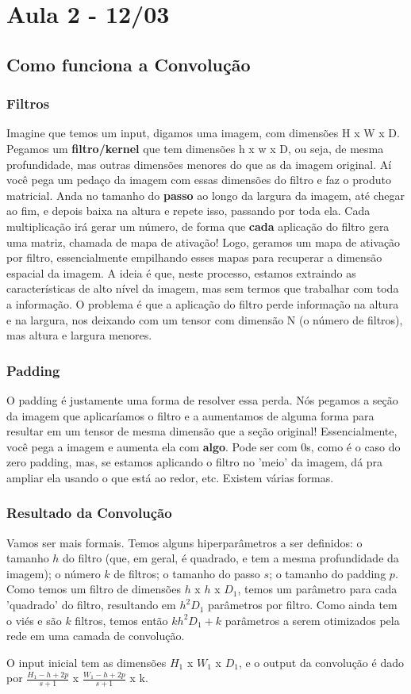 \documentclass{article}
\begin{document}
\section{Aula 2 - 12/03}
\subsection{Como funciona a Convolução}
\subsubsection{Filtros}
Imagine que temos um input, digamos uma imagem, com dimensões H x W x D. Pegamos um \textbf{filtro/kernel} que tem dimensões h x w x D, ou seja, de mesma profundidade, mas outras dimensões menores do que as da imagem original. Aí você pega um pedaço da imagem com essas dimensões do filtro e faz o produto matricial. Anda no tamanho do \textbf{passo} ao longo da largura da imagem, até chegar ao fim, e depois baixa na altura e repete isso, passando por toda ela. Cada multiplicação irá gerar um número, de forma que \textbf{cada} aplicação do filtro gera uma matriz, chamada de mapa de ativação! Logo, geramos um mapa de ativação por filtro, essencialmente empilhando esses mapas para recuperar a dimensão espacial da imagem. 
A ideia é que, neste processo, estamos extraindo as características de alto nível da imagem, mas sem termos que trabalhar com toda a informação. O problema é que a aplicação do filtro perde informação na altura e na largura, nos deixando com um tensor com dimensão N (o número de filtros), mas altura e largura menores. 
\subsubsection{Padding}
O padding é justamente uma forma de resolver essa perda. Nós pegamos a seção da imagem que aplicaríamos o filtro e a aumentamos de alguma forma para resultar em um tensor de mesma dimensão que a seção original! Essencialmente, você pega a imagem e aumenta ela com \textbf{algo}. Pode ser com 0s, como é o caso do zero padding, mas, se estamos aplicando o filtro no 'meio' da imagem, dá pra ampliar ela usando o que está ao redor, etc. Existem várias formas.
\subsubsection{Resultado da Convolução}
Vamos ser mais formais. Temos alguns hiperparâmetros a ser definidos:
o tamanho $h$ do filtro (que, em geral, é quadrado, e tem a mesma profundidade da imagem); o número $k$ de filtros; o tamanho do passo $s$; o tamanho do padding $p$. Como temos um filtro de dimensões $h$ x $h$ x $D_1$, temos um parâmetro para cada 'quadrado' do filtro, resultando em $h^2 D_1$ parâmetros por filtro. Como ainda tem o viés e são $k$ filtros, temos então $kh^2D_1 + k$ parâmetros a serem otimizados pela rede em uma camada de convolução. \par
O input inicial tem as dimensões $H_1$ x $W_1$ x $D_1$, e o output da convolução é dado por $\frac{H_1 - h + 2p}{s+1}$ x $\frac{W_1 - h + 2p}{s+1}$ x k.
\end{document}
